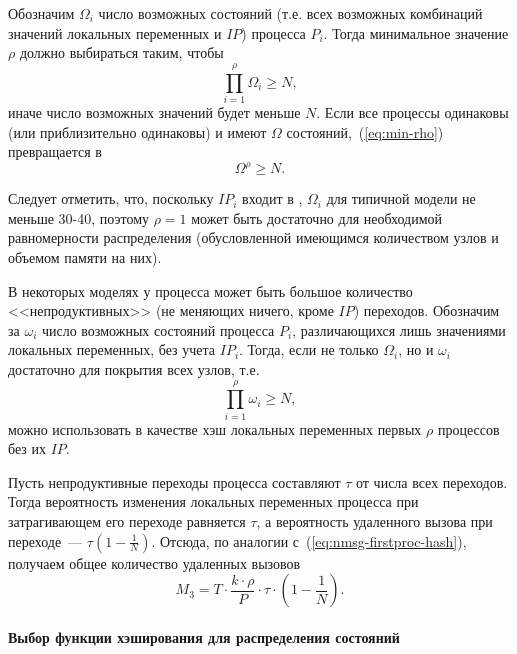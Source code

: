 Обозначим $\Omega_i$ число возможных состояний (т.е. всех возможных комбинаций значений
локальных переменных и $IP$) процесса $P_i$. Тогда минимальное значение $\rho$ должно
выбираться таким, чтобы
\begin{equation}
  \label{eq:min-rho}
  \prod_{i = 1}^\rho{\Omega_i} \geq N,
\end{equation}
иначе число возможных значений  будет меньше $N$. Если все процессы
одинаковы (или приблизительно одинаковы) и имеют $\Omega$ состояний,~(\ref{eq:min-rho})
превращается в 
\begin{equation}
  \label{eq:min-rho-homo}
  \Omega^\rho \geq N.
\end{equation}

Следует отметить, что, поскольку $IP_i$ входит в , $\Omega_i$ для типичной
модели не меньше 30-40, поэтому $\rho = 1$ может быть достаточно для необходимой
равномерности распределения (обусловленной имеющимся количеством узлов и объемом памяти на
них).

В некоторых моделях у процесса может быть большое количество <<непродуктивных>> (не
меняющих ничего, кроме $IP$) переходов. Обозначим за $\omega_i$ число возможных состояний
процесса $P_i$, различающихся лишь значениями локальных переменных, без учета
$IP_i$. Тогда, если не только $\Omega_i$, но и $\omega_i$ достаточно для покрытия всех
узлов, т.е.
\begin{equation}
  \label{eq:min-rho-noip}
  \prod_{i = 1}^\rho{\omega_i} \geq N,
\end{equation}
можно использовать в качестве  хэш локальных переменных первых $\rho$
процессов без их $IP$.

Пусть непродуктивные переходы процесса составляют $\tau$ от числа всех переходов. Тогда
вероятность изменения локальных переменных процесса при затрагивающем его переходе
равняется $\tau$, а вероятность удаленного вызова при переходе~--- $\tau (1 -
\frac{1}{N})$. Отсюда, по аналогии с~(\ref{eq:nmsg-firstproc-hash}), получаем общее
количество удаленных вызовов
\begin{equation}
  \label{eq:nmsg-firstproc-noip-hash}
  M_3 = T \cdot \frac{k\cdot\rho}{P} \cdot \tau \cdot (1 - \frac{1}{N}).
\end{equation}

\paragraph{Выбор функции хэширования для распределения состояний}
\label{sec:partition-hash-function}

